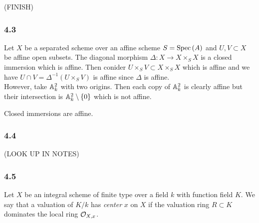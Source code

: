 \documentclass[12pt]{article}
\begin{document}
(FINISH)

\subsubsection{4.3}

Let $X$ be a separated scheme over an affine scheme $S = \mathrm{Spec}\left( A \right)$ and $U, V \subset X$ be affine open subsets. The diagonal morphism $\Delta : X \to X \times_S X$ is a closed immersion which is affine. Then conider $U \times_S V \subset X \times_S X$ which is affine and we have $U \cap V = \Delta^{-1}(U \times_S V)$ is affine since $\Delta$ is affine.
\bigskip\\
However, take $\mathbb{A}^2_k$ with two origins. Then each copy of $\mathbb{A}^2_k$ is clearly affine but their intersection is $\mathbb{A}^2_k \setminus \{ 0 \}$ which is not affine. 

\begin{lemma}
Closed immersions are affine.
\end{lemma}


\subsubsection{4.4}

(LOOK UP IN NOTES)

\subsubsection{4.5}

Let $X$ be an integral scheme of finite type over a field $k$ with function field $K$. We say that a valuation of $K / k$ has \textit{center} $x$ on $X$ if the valuation ring $R \subset K$ dominates the local ring $\mathcal{O}_{X, x}$.
\end{document}
